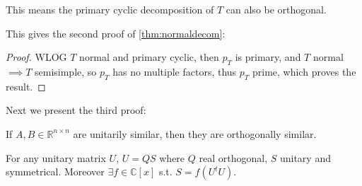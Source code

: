 \begin{remark}
    This means the primary cyclic decomposition of $T$ can also be orthogonal.
\end{remark}

This gives the second proof of \autoref{thm:normaldecom}:
\begin{proof}[Proof]
    WLOG $T$ normal and primary cyclic,
	then $p_T$ is primary, and $T$ normal $ \implies T$ semisimple,
	so $p_T$ has no multiple factors, thus $p_T$ prime, which proves the result.
\end{proof}

Next we present the third proof:
\begin{proposition}
	If $A, B\in \mathbb{R}^{n\times n}$ are unitarily similar,
	then they are orthogonally similar.
\end{proposition}

\begin{proposition}[QS decomposition]
	For any unitary matrix $U$, $U = QS$ where $Q$ real orthogonal, $S$ unitary
	and symmetrical. Moreover $\exists f\in \mathbb{C}[x]$ s.t. $S = f(U^tU)$.
\end{proposition}
